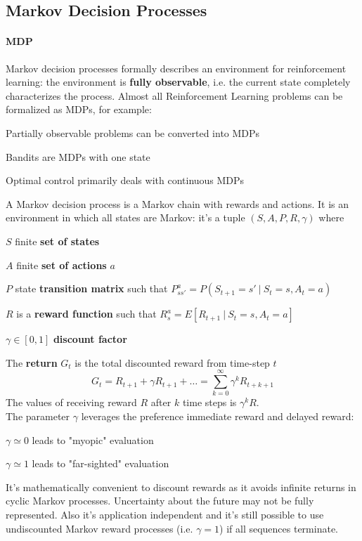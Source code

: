 \documentclass[10pt]{report}
\begin{document}
\subsection{Markov Decision Processes}
\paragraph{MDP} Markov decision processes formally describes an environment for reinforcement learning: the environment is \textbf{fully observable}, i.e. the current state completely characterizes the process. Almost all Reinforcement Learning problems can be formalized as MDPs, for example:
\begin{list}{}{}
	\item Partially observable problems can be converted into MDPs
	\item Bandits are MDPs with one state
	\item Optimal control primarily deals with continuous MDPs
\end{list}
A Markov decision process is a Markov chain with rewards and actions. It is an environment in which all states are Markov: it's a tuple $(S, A, P, R, \gamma)$ where\begin{list}{}{}
	\item $S$ finite \textbf{set of states}
	\item $A$ finite \textbf{set of actions} $a$
	\item $P$ state \textbf{transition matrix} such that $P_{ss'}^a = P(S_{t+1}=s'\:|\:S_t=s, A_t=a)$
	\item $R$ is a \textbf{reward function} such that $R_s^a = E[R_{t+1}\:|\:S_t=s,A_t=a]$
	\item $\gamma\in [0,1]$ \textbf{discount factor}
\end{list}
The \textbf{return} $G_t$ is the total discounted reward from time-step $t$
$$G_t = R_{t+1} + \gamma R_{t+1}+\ldots = \sum_{k=0}^\infty \gamma^kR_{t+k+1}$$
The values of receiving reward $R$ after $k$ time steps is $\gamma^k R$.\\
The parameter $\gamma$ leverages the preference immediate reward and delayed reward:
\begin{list}{}{}
	\item $\gamma\simeq 0$ leads to "myopic" evaluation
	\item $\gamma\simeq 1$ leads to "far-sighted" evaluation
\end{list}
It's mathematically convenient to discount rewards as it avoids infinite returns in cyclic Markov processes. Uncertainty about the future may not be fully represented. Also it's application independent and it's still possible to use undiscounted Markov reward processes (i.e. $\gamma=1$) if all sequences terminate.\\
\end{document}
